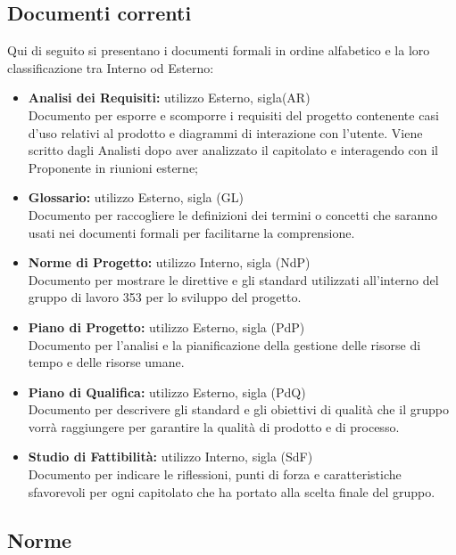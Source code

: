\documentclass[NormeDiProgetto.tex]{subfiles}
\begin{document}
	\subsection{Documenti correnti}
	Qui di seguito si presentano i documenti formali in ordine alfabetico e la loro classificazione tra Interno od Esterno:
	\begin{itemize}
		\item \textbf{Analisi dei Requisiti:} utilizzo Esterno, sigla(AR) \\
		 Documento per esporre e scomporre i requisiti del progetto contenente casi d'uso relativi al prodotto e diagrammi di interazione con l'utente. Viene scritto dagli Analisti dopo aver analizzato il capitolato e interagendo con il Proponente in riunioni esterne;
		
		\item \textbf{Glossario:}
		utilizzo Esterno, sigla (GL) \\
		Documento per raccogliere le definizioni dei termini o concetti che saranno usati nei documenti formali per facilitarne la comprensione.
		
		\item \textbf{Norme di Progetto:}
		utilizzo Interno, sigla (NdP) \\
		Documento per mostrare le direttive e gli standard utilizzati all'interno del gruppo di lavoro 353
		per lo sviluppo del progetto.
		
		\item \textbf{Piano di Progetto:}
		utilizzo Esterno, sigla (PdP) \\
		Documento per l'analisi e la pianificazione della gestione delle risorse di tempo e delle risorse umane.
		
		\item \textbf{Piano di Qualifica:}
		utilizzo Esterno, sigla (PdQ) \\
		Documento per descrivere gli standard e gli obiettivi di qualità che il gruppo vorrà raggiungere per garantire la qualità di prodotto e di processo.
		
		\item \textbf{Studio di Fattibilità:}
		utilizzo Interno, sigla (SdF) \\
		Documento per indicare le riflessioni, punti di forza e caratteristiche sfavorevoli per ogni capitolato che ha portato alla scelta finale del gruppo.
		
	\end{itemize}
	
	\subsection{Norme}
\end{document}
